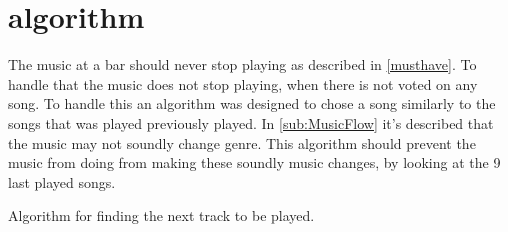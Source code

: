 \section{algorithm}
\label{sec:algorithm}

The music at a bar should never stop playing as described in \cref{musthave}. To handle that the music does not stop playing, when there is not voted on any song. To handle this an algorithm was designed to chose a song similarly to the songs that was played previously played. In \cref{sub:MusicFlow} it's described that the music may not soundly change genre. This algorithm should prevent the music from doing from making these soundly music changes, by looking at the 9 last played songs.

\begin{algorithm}
\caption{Algorithm for finding the next track to be played.}
\begin{algorithmic}
	 
		\EndIf{}
					\Else{}
					\EndIf{}
				\EndFor{}
			\EndFor{}
		\EndFor{}
			\EndIf{}
		\EndFor{}
			\State{}			
			\EndIf{}
		\EndFor{}
	\EndFunction{}
\end{algorithmic}
\end{algorithm}
